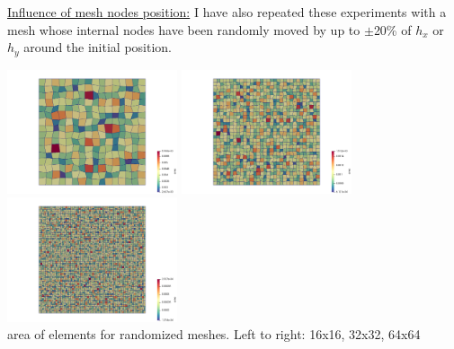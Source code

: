 \vspace{.5cm}

\underline{Influence of mesh nodes position:} I have also repeated these 
experiments with a mesh whose internal nodes have been 
randomly moved by up to $\pm$20\% of $h_x$ or $h_y$ around the initial position. 

\begin{center}
\includegraphics[width=5cm]{python_codes/fieldstone_72/results/mms/area16}
\includegraphics[width=5cm]{python_codes/fieldstone_72/results/mms/area32}
\includegraphics[width=5cm]{python_codes/fieldstone_72/results/mms/area64}\\
{\captionfont area of elements for randomized meshes. Left to right: 16x16, 32x32, 64x64}
\end{center}


